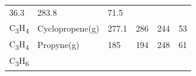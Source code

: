 \documentclass[
]{book}
\theoremstyle{definition}
\theoremstyle{definition}
\theoremstyle{definition}
\theoremstyle{remark}
\begin{document}
\begin{longtable}[]{@{}llllll@{}}
\begin{minipage}[t]{0.15\columnwidth}
36.3\strut
\end{minipage} & \begin{minipage}[t]{0.14\columnwidth}\raggedright
283.8\strut
\end{minipage} & \begin{minipage}[t]{0.14\columnwidth}\raggedright
71.5\strut
\end{minipage}\tabularnewline
\begin{minipage}[t]{0.07\columnwidth}\raggedright
C\textsubscript{3}H\textsubscript{4}\strut
\end{minipage} & \begin{minipage}[t]{0.17\columnwidth}\raggedright
Cyclopropene(g)\strut
\end{minipage} & \begin{minipage}[t]{0.15\columnwidth}\raggedright
277.1\strut
\end{minipage} & \begin{minipage}[t]{0.15\columnwidth}\raggedright
286\strut
\end{minipage} & \begin{minipage}[t]{0.14\columnwidth}\raggedright
244\strut
\end{minipage} & \begin{minipage}[t]{0.14\columnwidth}\raggedright
53\strut
\end{minipage}\tabularnewline
\begin{minipage}[t]{0.07\columnwidth}\raggedright
C\textsubscript{3}H\textsubscript{4}\strut
\end{minipage} & \begin{minipage}[t]{0.17\columnwidth}\raggedright
Propyne(g)\strut
\end{minipage} & \begin{minipage}[t]{0.15\columnwidth}\raggedright
185\strut
\end{minipage} & \begin{minipage}[t]{0.15\columnwidth}\raggedright
194\strut
\end{minipage} & \begin{minipage}[t]{0.14\columnwidth}\raggedright
248\strut
\end{minipage} & \begin{minipage}[t]{0.14\columnwidth}\raggedright
61\strut
\end{minipage}\tabularnewline
\begin{minipage}[t]{0.07\columnwidth}\raggedright
C\textsubscript{3}H\textsubscript{6}\strut
\end{minipage} & \begin{minipage}[t]{0.17\columnwidth}\raggedright

\end{minipage}
\end{longtable}
\end{document}
